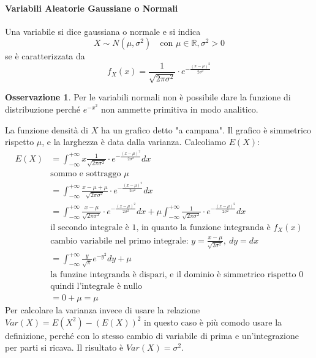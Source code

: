 \documentclass{article}
\theoremstyle{plain}
\theoremstyle{definition}
\newtheorem{osservazione}{Osservazione}[section]
\theoremstyle{remark}
\begin{document}
\paragraph{Variabili Aleatorie Gaussiane o Normali} %
\label{par:variabili_aleatorie_gaussiane_o_normali}
Una variabile si dice gaussiana o normale e si indica
\begin{equation*}
	X\sim N(\mu, \sigma^2)\quad\text{con }\mu\in\mathds{R},\sigma^2>0
\end{equation*}
se è caratterizzata da
\begin{equation*}
	f_X(x)=\frac{1}{\sqrt{2\pi\sigma^2}}\cdot e^{-\frac{(x-\mu)^2}{2\sigma^2}}
\end{equation*}
\begin{osservazione}
	Per le variabili normali non è possibile dare la funzione di distribuzione perché $e^{-x^2}$ non ammette primitiva in modo analitico.
\end{osservazione}
La funzione densità di $X$ ha un grafico detto "a campana". Il grafico è simmetrico rispetto $\mu$, e la larghezza è data dalla varianza. Calcoliamo $E(X)$:
\begin{align*}
	E(X)&=\int_{-\infty}^{+\infty}x\frac{1}{\sqrt{2\pi\sigma^2}}\cdot e^{-\frac{(x-\mu)^2}{2\sigma^2}}dx\\
	&\text{sommo e sottraggo }\mu\\
	&=\int_{-\infty}^{+\infty}\frac{x-\mu+\mu}{\sqrt{2\pi\sigma^2}}\cdot e^{-\frac{(x-\mu)^2}{2\sigma^2}}dx\\
	&=\int_{-\infty}^{+\infty}\frac{x-\mu}{\sqrt{2\pi\sigma^2}}\cdot e^{-\frac{(x-\mu)^2}{2\sigma^2}}dx+\mu\int_{-\infty}^{+\infty}\frac{1}{\sqrt{2\pi\sigma^2}}\cdot e^{-\frac{(x-\mu)^2}{2\sigma^2}}dx\\
	&\text{il secondo integrale è }1\text{, in quanto la funzione integranda è }f_X(x)\\
	&\text{cambio variabile nel primo integrale: }y=\frac{x-\mu}{\sqrt{2\sigma^2}},\ dy=dx\\
	&=\int_{-\infty}^{+\infty}\frac{y}{\sqrt{\pi}}e^{-y^2}dy+\mu\\
	&\text{la funzine integranda è dispari, e il dominio è simmetrico rispetto }0\\
	&\text{quindi l'integrale è nullo}\\
	&=0+\mu=\mu
\end{align*}
Per calcolare la varianza invece di usare la relazione $Var(X)=E(X^2)-(E(X))^2$ in questo caso è più comodo usare la definizione, perché con lo stesso cambio di variabile di prima e un'integrazione per parti si ricava. Il risultato è $Var(X)=\sigma^2$.
\end{document}
